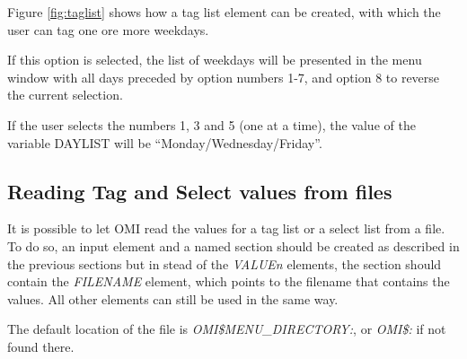 \documentclass[a4paper]{book}
\begin{document}
Figure \ref{fig:taglist} shows how a tag list element can be created, with which the 
user can tag one ore more weekdays.

If this option is selected, the list of weekdays will be presented in the 
menu window with all days preceded by option numbers 1-7, and option 8 to 
reverse the current selection.

If the user selects the numbers 1, 3 and 5 (one at a time), the value of the 
variable DAYLIST will be ``Monday/Wednesday/Friday''.

\subsection{Reading Tag and Select values from files}
\label{subsubsec:reading}

It is possible to let OMI read the values for a tag list or a select list 
from a file. To do so, an input element and a named section should be 
created as described in the previous sections but in stead of the \textsl{VALUE\textit{n}} 
elements, the section should contain the \textsl{FILENAME} element, which points to 
the filename that contains the values. All other elements can still be used 
in the same way.

The default location of the file is \textsl{OMI{\$}MENU{\_}DIRECTORY:}, or \textsl{OMI{\$}:} if 
not found there.
\end{document}

